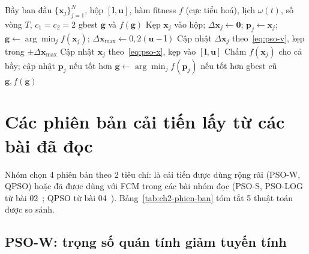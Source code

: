 \begin{algorithm}[htbp]
\caption{PSO có vận tốc (tệp \texttt{pso\_co\_so.py}), dùng cho PSO gốc, PSO-W, PSO-S, PSO-LOG}
\label{alg:pso}
\begin{algorithmic}[1]
\REQUIRE Bầy ban đầu $\{\mathbf{x}_j\}_{j=1}^{N}$, hộp $[\mathbf{l}, \mathbf{u}]$, hàm fitness $f$ (cực tiểu hoá),
  lịch $\omega(t)$, số vòng $T$, $c_1 = c_2 = 2$
\ENSURE gbest $\mathbf{g}$ và $f(\mathbf{g})$
\STATE Kẹp $\mathbf{x}_j$ vào hộp; $\Delta\mathbf{x}_j \leftarrow \mathbf{0}$; $\mathbf{p}_j \leftarrow \mathbf{x}_j$;
  $\mathbf{g} \leftarrow \arg\min_j f(\mathbf{x}_j)$; $\Delta\mathbf{x}_{\max} \leftarrow 0{,}2(\mathbf{u} - \mathbf{l})$
    \STATE Cập nhật $\Delta\mathbf{x}_j$ theo~\eqref{eq:pso-v}, kẹp trong $\pm\Delta\mathbf{x}_{\max}$
    \STATE Cập nhật $\mathbf{x}_j$ theo~\eqref{eq:pso-x}, kẹp vào $[\mathbf{l}, \mathbf{u}]$
  \ENDFOR
  \STATE Chấm $f(\mathbf{x}_j)$ cho cả bầy; cập nhật $\mathbf{p}_j$ nếu tốt hơn
  \STATE $\mathbf{g} \leftarrow \arg\min_j f(\mathbf{p}_j)$ nếu tốt hơn gbest cũ
\ENDFOR
\RETURN $\mathbf{g}, f(\mathbf{g})$
\end{algorithmic}
\end{algorithm}

\section{Các phiên bản cải tiến lấy từ các bài đã đọc}
\label{sec:pso-cai-tien}

Nhóm chọn 4 phiên bản theo 2 tiêu chí: là cải tiến được dùng rộng rãi (PSO-W, QPSO) hoặc đã được dùng với FCM trong
các bài nhóm đọc (PSO-S, PSO-LOG từ bài 02~\cite{qian2022psofcm}; QPSO từ bài 04~\cite{zhang2025qpsofcm}). Bảng~\ref{tab:ch2-phien-ban}
tóm tắt 5 thuật toán được so sánh.

\subsection{PSO-W: trọng số quán tính giảm tuyến tính}
\label{sec:pso-w}


